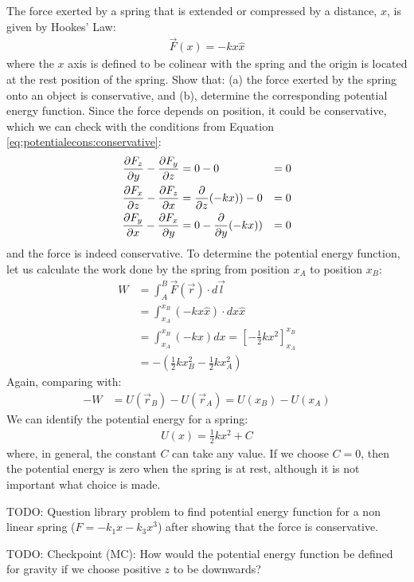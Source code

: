 \begin{example}{\label{ex:potentialecons:springpotential}The force exerted by a spring that is extended or compressed by a distance, $x$, is given by Hookes' Law:
\begin{align*}
\vec F(x) = -k x\hat x
\end{align*}
where the $x$ axis is defined to be colinear with the spring and the origin is located at the rest position of the spring. Show that: (a) the force exerted by the spring onto an object is conservative, and (b), determine the corresponding potential energy function. }
Since the force depends on position, it could be conservative, which we can check with the conditions from Equation \ref{eq:potentialecons:conservative}:
\begin{align*}
\frac{\partial F_z}{\partial y}-\frac{\partial F_y}{\partial z} &= 0 - 0 &= 0\\
\frac{\partial F_x}{\partial z}-\frac{\partial F_z}{\partial x} &= \frac{\partial }{\partial z}(-kx)) - 0&= 0\\
\frac{\partial F_y}{\partial x}-\frac{\partial F_x}{\partial y} &= 0 - \frac{\partial }{\partial y}(-kx)) &=0
\end{align*}
and the force is indeed conservative. To determine the potential energy function, let us calculate the work done by the spring from position $x_A$ to position $x_B$:
\begin{align*}
W &=\int_A^B \vec F(\vec r) \cdot d\vec l\\
&=\int_{x_A}^{x_B} (-kx\hat x) \cdot dx \hat x\\
&=\int_{x_A}^{x_B} (-kx)dx=\left[-\frac{1}{2}kx^2  \right]_{x_A}^{x_B}\\
&=-\left( \frac{1}{2}kx_B^2-\frac{1}{2}kx_A^2 \right)
\end{align*}
Again, comparing with:
\begin{align*}
-W &= U(\vec r_B) - U(\vec r_A) = U(x_B) - U(x_A)
\end{align*}
We can identify the potential energy for a spring:
\begin{align*}
U(x) = \frac{1}{2}kx^2 + C
\end{align*}
where, in general, the constant $C$ can take any value. If we choose $C=0$, then the potential energy is zero when the spring is at rest, although it is not important what choice is made.
\end{example}

TODO: Question library problem to find potential energy function for a non linear spring ($F=-k_1x-k_3x^3$) after showing that the force is conservative.

TODO: Checkpoint (MC): How would the potential energy function be defined for gravity if we choose positive $z$ to be downwards?

